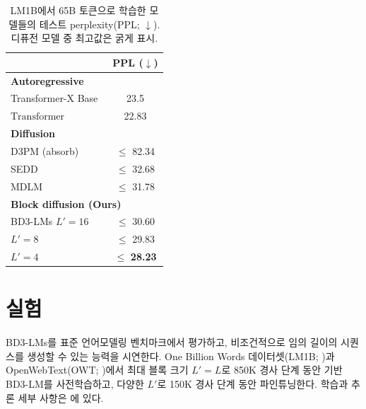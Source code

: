 \documentclass{article} %
\def\algos{BD3-LMs}
\def\algo{BD3-LM}
\begin{document}
\begin{table}
  \vspace{-20pt}
  \small
  \caption{LM1B에서 65B 토큰으로 학습한 모델들의 테스트 perplexity(PPL; $\downarrow$). 디퓨전 모델 중 최고값은 굵게 표시.}
  \label{tab:lm1b-ppl}
  \centering
  \vspace{-10pt}
  \setlength{\tabcolsep}{2pt} %
  \begin{tabular}{lc}
    \toprule
      & PPL ($\downarrow$) \\
    \midrule
    \multicolumn{2}{l}{\textbf{Autoregressive}} \\
    Transformer-X Base{~\citep{dai2019transformer}}  &  23.5 \\
    $\text{Transformer}$~\citep{sahoo2024simple}  & 22.83 \\
    \midrule
    \multicolumn{2}{l}{\textbf{Diffusion}} \\
    D3PM (absorb)~\citep{austin2021structured}  & $\leq$ 82.34  \\
    SEDD ~\citep{lou2024discrete}  & $\leq$ 32.68   \\
    MDLM ~\citep{sahoo2024simple}  & $\leq$ 31.78\\
    \midrule
    \multicolumn{2}{l}{\textbf{Block diffusion (Ours)}} \\
    \algos{} $L'=16$   & $\leq$ 30.60 \\ 
    \hspace{4.1em} $L'=8$   & $\leq$ 29.83\\
    \hspace{4.1em} $L'=4$  & $\leq$ \textbf{28.23}  \\
    \bottomrule
  \end{tabular}
  \vspace{-20pt}
\end{table}

\section{실험}\label{sec:experiments}

\algos{}를 표준 언어모델링 벤치마크에서 평가하고, 비조건적으로 임의 길이의 시퀀스를 생성할 수 있는 능력을 시연한다. One Billion Words 데이터셋(LM1B; \citet{chelba2014billion})과 OpenWebText(OWT; \citet{Gokaslan2019OpenWeb})에서 최대 블록 크기 $L'=L$로 850K 경사 단계 동안 기반 \algo{}를 사전학습하고, 다양한 $L'$로 150K 경사 단계 동안 파인튜닝한다. 학습과 추론 세부 사항은 에 있다.
\end{document}
